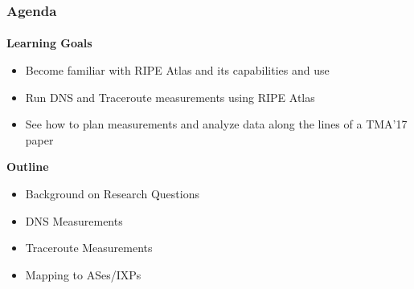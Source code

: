 


\PraesentationMasterKopfzeileDreizeiler

\PraesentationTitelseite

\PraesentationMasterStandard


\usetikzlibrary{shapes,arrows,shadows}



\begin{frame}[fragile]
	\frametitle{Agenda}
	\framesubtitle{}

	\textbf{Learning Goals}
	\begin{itemize}
		\item Become familiar with RIPE Atlas and its capabilities and use
		\item Run DNS and Traceroute measurements using RIPE Atlas
		\item See how to plan measurements and analyze data along the lines of a TMA'17 paper
	\end{itemize}	

	\textbf{Outline}
\begin{itemize}
	\item Background on Research Questions
	\item DNS Measurements
	\item Traceroute Measurements
	\item Mapping to ASes/IXPs
\end{itemize}	



\end{frame}
\clearpage

